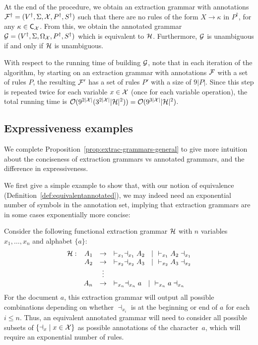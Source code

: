At the end of the procedure, we obtain an extraction grammar with annotations $\mathcal{F}^\dagger = (V^\dagger, \Sigma, \mathcal{X}, P^\dagger, S^\dagger)$ such that there are no rules of the form $X\to\kappa$ in $P^\dagger$, for any $\kappa\in\textsf{C}_{\mathcal{X}}$. From this, we obtain the annotated grammar $\mathcal{G} = (V^\dagger, \Sigma, \Omega_{\mathcal{X}}, P^\dagger, S^\dagger)$ which is equivalent to $\mathcal{H}$. Furthermore, $\mathcal{G}$ is unambiguous if and only if $\mathcal{H}$ is unambiguous.

With respect to the running time of building $\mathcal{G}$, note that in each iteration of the algorithm, by starting on an extraction grammar with annotations $\mathcal{F}$ with a set of rules $P$, the resulting $\mathcal{F}'$ has a set of rules $P'$ with a size of $9|P|$. Since this step is repeated twice for each variable $x\in \mathcal{X}$ (once for each variable operation), 
the total running time is $\mathcal{O}(9^{2|\mathcal{X}|}(3^{2|\mathcal{X}|}|\mathcal{H}|^2)) = \mathcal{O}(9^{3|\mathcal{X}|}|\mathcal{H}|^2)$.
%
%
%

\subsection{Expressiveness examples}
\label{apx:spanexa}

We complete Proposition~\ref{prop:extrac-grammars-general} to give more
intuition about the conciseness of extraction grammars vs annotated grammars,
and the difference in expressiveness.

We first give a simple example to show that, with our notion of equivalence
(Definition~\ref{def:equivalentannotated}), we may indeed need an exponential number of symbols in the annotation set, implying that extraction grammars are in some cases exponentially more concise:

%
\begin{example}
Consider the following functional extraction grammar $\mathcal{H}$ with $n$ variables $x_1, \ldots, x_n$ and alphabet $\{a\}$:
  \[
\begin{array}{rrcl}
	\cH: & A_1 & \rightarrow &  \vdash_{x_1} \dashv_{x_1} A_2 \ \ \mid \ \ \vdash_{x_1} A_2 \dashv_{x_1} \\
	&  A_2 & \rightarrow &  \vdash_{x_2} \dashv_{x_2} A_3 \ \ \mid \ \ \vdash_{x_2} A_3 \dashv_{x_2} \\
	&  & \vdots & \\
	&  A_{n} & \rightarrow &  \vdash_{x_n} \dashv_{x_n} a \ \ \mid  \ \ \vdash_{x_n} a \dashv_{x_n} \\
\end{array}
\]
For the document $a$, this extraction grammar will output all possible combinations depending on whether $\dashv_{x_i}$ is at the beginning or end of $a$ for each $i \leq n$. Thus, an equivalent annotated grammar will need to consider all possible subsets of $\{ {\dashv_x} \mid x\in \mathcal{X}\}$ as possible annotations of the character~$a$, which will require an exponential number of rules.
\end{example}

